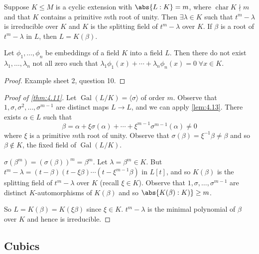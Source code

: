 \documentclass{article}
\DeclareMathOperator{\chara}{char}
\DeclareMathOperator{\Gal}{Gal}
\begin{document}
\begin{nthm}\label{thm:4.11}
    Suppose $K \leq M$ is a cyclic extension with $\abs{L:K} = m$, where $\chara K \nmid m$ and that $K$ contains a primitive $m$th root of unity.
    Then $\exists \lambda \in K$ such that $t^m - \lambda$ is irreducible over $K$ and $K$ is the splitting field of $t^m - \lambda$ over $K$.
    If $\beta$ is a root of $t^m - \lambda$ in $L$, then $L = K(\beta)$.
\end{nthm}


\begin{nlemma}\label{lem:4.13}
    Let $\phi_1, \dotsc, \phi_n$ be embeddings of a field $K$ into a field $L$.
    Then there do not exist $\lambda_1, \dotsc, \lambda_n$ not all zero such that $\lambda_1 \phi_1(x) + \dotsb + \lambda_n \phi_n(x) = 0 \; \forall x \in K$.
\end{nlemma}
\begin{proof}
    Example sheet 2, question 10.
\end{proof}
\begin{proof}[Proof of \cref{thm:4.11}]
    Let $\Gal(L/K) = \langle \sigma \rangle$ of order $m$.
    Observe that $1, \sigma, \sigma^2, \dotsc, \sigma^{m-1}$ are distinct maps $L \to L$, and we can apply \cref{lem:4.13}.
    There exists $\alpha \in L$ such that
    \begin{equation*}
        \beta = \alpha + \xi \sigma(\alpha) + \dotsb + \xi^{m-1} \sigma^{m-1}(\alpha) \neq 0
    \end{equation*}
    where $\xi$ is a primitive $m$th root of unity.
    Observe that $\sigma(\beta) = \xi^{-1} \beta \neq \beta$ and so $\beta \notin K$, the fixed field of $\Gal(L/K)$.

    $\sigma(\beta^m) = (\sigma(\beta))^m = \beta^m$. Let $\lambda = \beta^m \in K$.
    But $t^m - \lambda = (t-\beta)(t-\xi\beta)\dotsm(t-\xi^{m-1}\beta)$ in $L[t]$, and so $K(\beta)$ is the splitting field of $t^m - \lambda$ over $K$ (recall $\xi \in K$).
    Observe that $1, \sigma, \dotsc, \sigma^{m-1}$ are distinct $K$-automorphisms of $K(\beta)$ and so $\abs{K(\beta):K)} \geq m$.

    So $L = K(\beta) = K(\xi\beta)$ since $\xi \in K$.
    $t^m - \lambda$ is the minimal polynomial of $\beta$ over $K$ and hence is irreducible.
\end{proof}

\subsection{Cubics}
\end{document}
